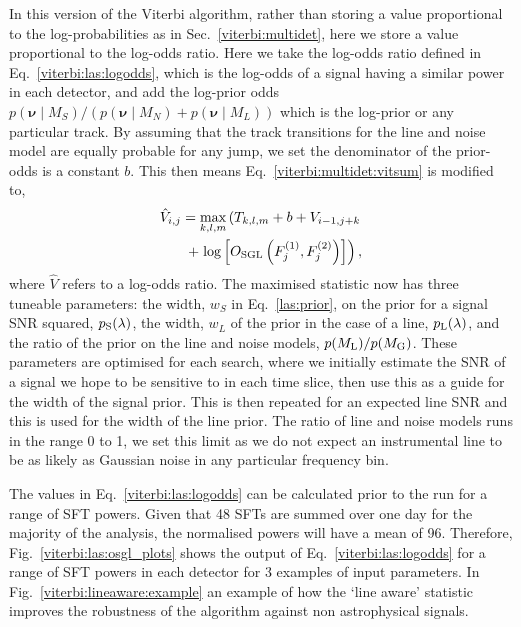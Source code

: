 In this version of the Viterbi algorithm, rather than storing a value proportional to the log-probabilities as in Sec.~\ref{viterbi:multidet}, here we store a value proportional to the log-odds ratio.
Here we take the log-odds ratio defined in Eq.~\ref{viterbi:las:logodds}, which is the log-odds of a signal having a similar power in each detector, and add the log-prior odds $p(\bm{\nu} \mid M_S)/(p(\bm{\nu} \mid M_N) + p(\bm{\nu} \mid M_L))$ which is the log-prior or any particular track. By assuming that the track transitions for the line and noise model are equally probable for any jump, we set the denominator of the prior-odds is a constant $b$.
This then means Eq.~\ref{viterbi:multidet:vitsum} is modified to,
\begin{equation}
\begin{split}
\label{lineaware:stat}
\hat{V}_{i,j} = \max_{k,l,m}\left(T_{k,l,m} + b + V_{i-1,j+k}   \right. \\
 + \left.  \log\left[O_{\rm{SGL}}\left(F^{(1)}_{j},F^{(2)}_{j}\right)\right]\right),
\end{split}
\end{equation}
%
where $\hat{V}$ refers to a log-odds ratio.
The maximised statistic now has three tuneable parameters: the width, $w_S$ in Eq.~\ref{las:prior}, on the prior for a signal \ac{SNR} squared, $p_{\rm S}(\lambda)$, the width, $w_L$ of the prior in the case of a line, $p_{\rm L}(\lambda)$, and the ratio of the prior on the line and noise models, $p({M_{\rm L}})/p({M_{\rm G}})$.  These parameters are optimised for each search, where we initially estimate the \ac{SNR} of a signal we hope to be sensitive to in each time slice, then use this as a guide for the width of the signal prior. This is then repeated for an expected line \ac{SNR} and this is used for the width of the line prior. The ratio of line and noise models runs in the range 0 to 1, we set this limit as we do not expect an instrumental line to be as likely as Gaussian noise in any particular frequency bin.

The values in Eq.~\ref{viterbi:las:logodds} can be calculated prior to the run for a range of \ac{SFT} powers. Given that 48 \acp{SFT} are summed over one day for the majority of the analysis, the normalised powers will have a mean of 96. 
Therefore, Fig.~\ref{viterbi:las:osgl_plots} shows the output of Eq.~\ref{viterbi:las:logodds} for a range of \ac{SFT} powers in each detector for 3 examples of input parameters. 
In Fig.~\ref{viterbi:lineaware:example} an example of how the `line aware' statistic improves the robustness of the algorithm against non astrophysical signals. 


